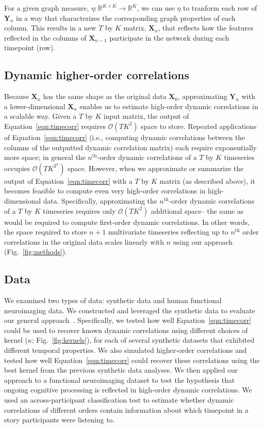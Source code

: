 \documentclass[english]{article}
\begin{document}
For a given graph measure,
$\eta: \mathbb{R}^{K \times K} \rightarrow \mathbb{R}^K$, we can use
$\eta$ to tranform each row of $\mathbf{Y}_n$ in a way that
characterizes the corresponding graph properties of each
column.  This results in a new $T$ by $K$ matrix, $\mathbf{X}_n$, that
reflects how the features reflected in the columns of $\mathbf{X}_{n-1}$
participate in the network during each timepoint (row).


\subsection*{Dynamic higher-order correlations}

Because $\mathbf{X}_n$ has the same shape as the original data
$\mathbf{X}_0$, approximating $\mathbf{Y}_n$ with a lower-dimensional
$\mathbf{X}_n$ enables us to estimate high-order dynamic correlations
in a scalable way.  Given a $T$ by $K$ input matrix, the output of
Equation~\ref{eqn:timecorr} requires $\mathcal{O}(TK^2)$ space to
store.  Repeated applications of Equation~\ref{eqn:timecorr} (i.e.,
computing dynamic correlations between the columns of the outputted
dynamic correlation matrix) each require exponentially more space; in
general the $n^\mathrm{th}$-order dynamic correlations of a $T$ by $K$
timeseries occupies $\mathcal{O}(TK^{2^n})$ space.  However, when we
approximate or summarize the output of Equation~\ref{eqn:timecorr} with a $T$ by
$K$ matrix (as described above), it becomes feasible to compute even
very high-order correlations in high-dimensional data.  Specifically,
approximating the $n^\mathrm{th}$-order dynamic correlations of a $T$
by $K$ timeseries requires only $\mathcal{O}(TK^2)$ additional space--
the same as would be required to compute first-order dynamic
correlations. In other words, the space required to store $n+1$
multivariate timeseries reflecting up to $n^\mathrm{th}$ order
correlations in the original data scales linearly with $n$ using our
approach (Fig.~\ref{fig:methods}).

\subsection*{Data}
We examined two types of data: synthetic data and human functional
neuroimaging data.  We constructed and leveraged the synthetic data to
evaluate our general approach~\cite{ThomEtal18}.  Specifically, we tested how well
Equation~\ref{eqn:timecorr} could be used to recover known dynamic
correlations using different choices of kernel ($\kappa$;
Fig.~\ref{fig:kernels}), for each of several synthetic datasets that
exhibited different temporal properties. We also simulated
higher-order correlations and tested how well
Equation~\ref{eqn:timecorr} could recover these correlations using the
best kernel from the previous synthetic data analyses.  We then applied our
approach to a functional neuroimaging dataset to test the hypothesis
that ongoing cognitive processing is reflected in high-order dynamic
correlations.  We used an across-participant classification test to
estimate whether dynamic correlations of different orders contain
information about which timepoint in a story participants were
listening to.
\end{document}
